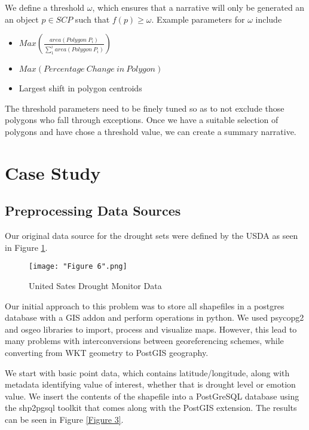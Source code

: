 \documentclass[conference]{IEEEtran}
\begin{document}
We define a threshold $\omega$, which ensures that a narrative will only be generated an an object $p \in SCP$ such that $f(p) \ge \omega$. Example parameters for $\omega$ include  

\begin{itemize}
\item $Max\left(\frac{area\left(Polygon\ P_i\right)}{\sum_{1}^{i}area\left(Polygon\ P_i\right)}\right)$
\item $Max\left(Percentage\ Change\ in\ Polygon\right)$
\item Largest shift in polygon centroids
\end{itemize}

The threshold parameters need to be finely tuned so as to not exclude those polygons who fall through exceptions. Once we have a suitable selection of polygons and have chose a threshold value, we can create a summary narrative. 


\section{Case Study}

\subsection{Preprocessing Data Sources}

Our original data source for the drought sets were defined by the USDA as seen in Figure \ref{Figure 2}.

\begin{figure}[ht]
\centerline{\texttt{[image: "Figure 6".png]}}
\caption{United Sates Drought Monitor Data}
\label{Figure 2}
\end{figure}

Our initial approach to this problem was to store all shapefiles in a postgres database with a GIS addon and perform operations in python. We used psycopg2 and osgeo libraries to import, process and visualize maps. However, this lead to many problems with interconversions between georeferencing schemes, while converting from WKT geometry to PostGIS geography.

We start with basic point data, which contains latitude/longitude, along with metadata identifying value of interest, whether that is drought level or emotion value. We insert the contents of the shapefile into a PostGreSQL database using the shp2pgsql toolkit that comes along with the PostGIS extension. The results can be seen in Figure \ref{Figure 3}.
\end{document}
